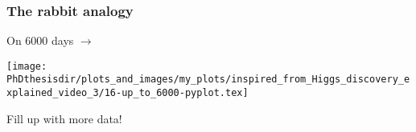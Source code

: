 

\begin{frame}
\frametitle{The rabbit analogy}
\addtocounter{framenumber}{-1}
\transwipe[direction=90]
\begin{center}
\begin{minipage}[c]{.29\textwidth}
On \num{6000} days $\rightarrow$
\end{minipage}
\begin{minipage}[c]{.4\textwidth}
\vspace{-\baselineskip}
\texttt{[image: \\PhDthesisdir/plots\_and\_images/my\_plots/inspired\_from\_Higgs\_discovery\_explained\_video\_3/16-up\_to\_6000-pyplot.tex]}
\end{minipage}
\begin{minipage}[c]{.29\textwidth}
Fill up with more data!
\end{minipage}
\end{center}
\end{frame}

